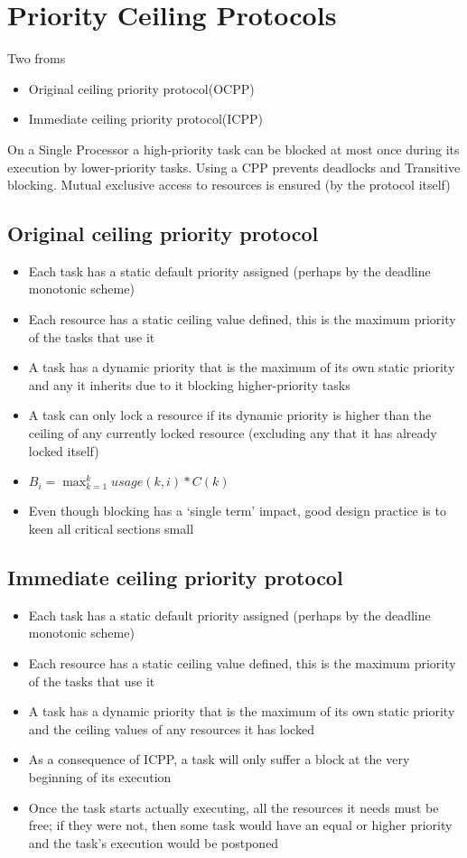 \section{Priority Ceiling Protocols}
Two froms

\begin{itemize}
\item Original ceiling priority protocol(OCPP)
\item Immediate ceiling priority protocol(ICPP)
\end{itemize}

On a Single Processor a high-priority task can be blocked at most once
during its execution by lower-priority tasks. Using a CPP prevents deadlocks and Transitive blocking. Mutual exclusive access to resources is ensured (by
the protocol itself)

\subsection{Original ceiling priority protocol}
\begin{itemize}
\item Each task has a static default priority assigned (perhaps by
the deadline monotonic scheme)
\item Each resource has a static ceiling value defined, this is the
maximum priority of the tasks that use it
\item A task has a dynamic priority that is the maximum of its
own static priority and any it inherits due to it blocking
higher-priority tasks
\item A task can only lock a resource if its dynamic priority is
higher than the ceiling of any currently locked resource
(excluding any that it has already locked itself)
\item $B_i = \max_{k=1}^k usage(k,i)*C(k)$
\item Even though blocking has a ‘single term’ impact,
good design practice is to keen all critical sections
small
\end{itemize}
\subsection{Immediate ceiling priority protocol}
\begin{itemize}
\item Each task has a static default priority assigned
(perhaps by the deadline monotonic scheme)
\item Each resource has a static ceiling value defined,
this is the maximum priority of the tasks that use it
\item A task has a dynamic priority that is the maximum
of its own static priority and the ceiling values of
any resources it has locked
\item As a consequence of ICPP, a task will only suffer a
block at the very beginning of its execution
\item Once the task starts actually executing, all the
resources it needs must be free; if they were not,
then some task would have an equal or higher
priority and the task's execution would be
postponed
\end{itemize}

